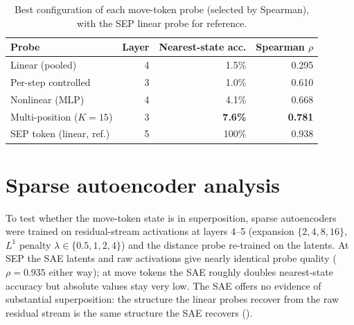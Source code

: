 \documentclass{article} %
\begin{document}
\begin{table}[h]
\centering
\caption{Best configuration of each move-token probe (selected by Spearman), with the SEP linear probe for reference.}
\label{tab:move-probe}
\begin{tabular}{lrrr}
\toprule
\textbf{Probe} & \textbf{Layer} & \textbf{Nearest-state acc.} & \textbf{Spearman $\rho$} \\
\midrule
Linear (pooled)              & 4 & 1.5\% & 0.295 \\
Per-step controlled          & 3 & 1.0\% & 0.610 \\
Nonlinear (MLP)              & 4 & 4.1\% & 0.668 \\
Multi-position ($K{=}15$)    & 3 & \textbf{7.6\%} & \textbf{0.781} \\
\midrule
SEP token (linear, ref.)     & 5 & 100\%   & 0.938 \\
\bottomrule
\end{tabular}
\end{table}

\section{Sparse autoencoder analysis}
\label{app:sae}
To test whether the move-token state is in superposition, sparse autoencoders were trained on residual-stream activations at layers 4--5 (expansion $\{2,4,8,16\}$, $L^1$ penalty $\lambda\in\{0.5,1,2,4\}$) and the distance probe re-trained on the latents. At SEP the SAE latents and raw activations give nearly identical probe quality ($\rho=0.935$ either way); at move tokens the SAE roughly doubles nearest-state accuracy but absolute values stay very low. The SAE offers no evidence of substantial superposition: the structure the linear probes recover from the raw residual stream is the same structure the SAE recovers ().
\end{document}
